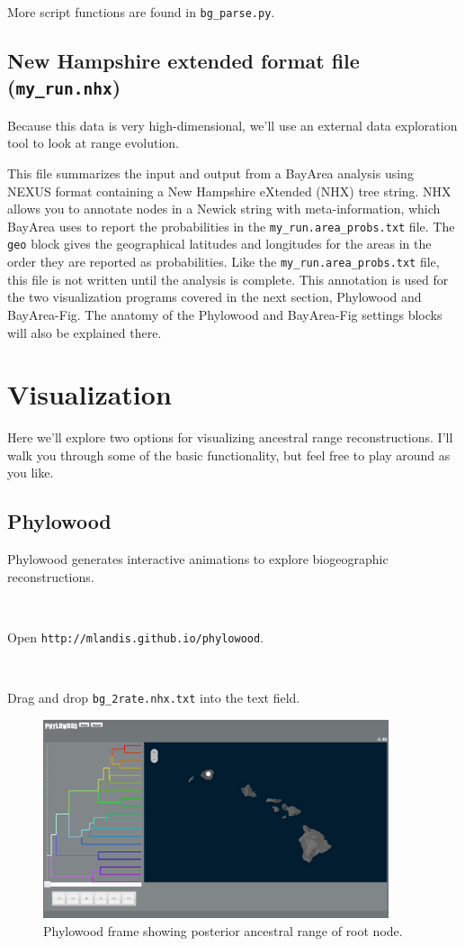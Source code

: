 \documentclass[11pt]{article}
\newcommand{\impmark}{\strut\vadjust{\domark}}
\newcommand{\domark}{%
  \vbox to 0pt{
    \kern-\dp\strutbox
    \smash{\llap{$\rightarrow$\kern1em}}
    \vss
  }%
}
\begin{document}
More script functions are found in {\tt bg\_parse.py}.

\subsection{New Hampshire extended format file (\texttt{my\_run.nhx})}

Because this data is very high-dimensional, we'll use an external data exploration tool to look at range evolution.

This file summarizes the input and output from a BayArea analysis using NEXUS format containing a New Hampshire eXtended (NHX) tree string.
NHX allows you to annotate nodes in a Newick string with meta-information, which BayArea uses to report the probabilities in the \texttt{my\_run.area\_probs.txt} file.
The \texttt{geo} block gives the geographical latitudes and longitudes for the areas in the order they are reported as probabilities.
Like the \texttt{my\_run.area\_probs.txt} file, this file is not written until the analysis is complete.
This annotation is used for the two visualization programs covered in the next section, Phylowood and BayArea-Fig.
The anatomy of the Phylowood and BayArea-Fig settings blocks will also be explained there.

\section{Visualization}

Here we'll explore two options for visualizing ancestral range reconstructions.
I'll walk you through some of the basic functionality, but feel free to play around as you like.

\subsection{Phylowood}

Phylowood generates interactive animations to explore biogeographic reconstructions.

\noindent \\ \impmark Open \texttt{http://mlandis.github.io/phylowood}.

\noindent \\ \impmark Drag and drop \texttt{bg\_2rate.nhx.txt} into the text field.

\begin{figure}[H]
\centering
\includegraphics[width=4in]{figures/phw_mrca}
\caption{Phylowood frame showing posterior ancestral range of root node.}
\end{figure}
\end{document}
